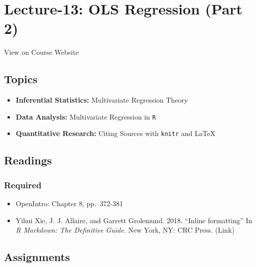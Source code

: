 \documentclass[]{book}
\providecommand{\tightlist}{%
  \setlength{\itemsep}{0pt}\setlength{\parskip}{0pt}}
\theoremstyle{definition}
\theoremstyle{definition}
\theoremstyle{definition}
\theoremstyle{remark}
\begin{document}
\hypertarget{lecture-13-ols-regression-part-2}{%
\section*{Lecture-13: OLS Regression (Part
2)}\label{lecture-13-ols-regression-part-2}}

View on Course Website

\hypertarget{topics-13}{%
\subsection*{Topics}\label{topics-13}}

\begin{itemize}
\tightlist
\item
  \textbf{Inferential Statistics:} Multivariate Regression Theory
\item
  \textbf{Data Analysis:} Multivariate Regression in \texttt{R}
\item
  \textbf{Quantitative Research:} Citing Sources with \texttt{knitr} and
  LaTeX
\end{itemize}

\hypertarget{readings-14}{%
\subsection*{Readings}\label{readings-14}}

\hypertarget{required-14}{%
\subsubsection*{Required}\label{required-14}}

\begin{itemize}
\tightlist
\item
  OpenIntro: Chapter 8, pp.~372-381
\item
  Yihui Xie, J. J. Allaire, and Garrett Grolemund. 2018. ``Inline
  formatting'' In \emph{R Markdown: The Definitive Guide.} New York, NY:
  CRC Press. (Link)
\end{itemize}

\hypertarget{assignments-14}{%
\subsection*{Assignments}\label{assignments-14}}
\end{document}
